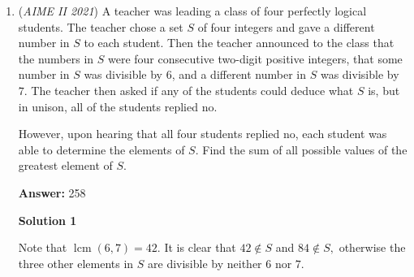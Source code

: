 \begin{enumerate}
 


	\item (\textit{AIME II 2021}) A teacher was leading a class of four perfectly logical students. The teacher chose a set $S$ of four integers and gave a different number in $S$ to each student. Then the teacher announced to the class that the numbers in $S$ were four consecutive two-digit positive integers, that some number in $S$ was divisible by $6$, and a different number in $S$ was divisible by $7$. The teacher then asked if any of the students could deduce what $S$ is, but in unison, all of the students replied no.


 However, upon hearing that all four students replied no, each student was able to determine the elements of $S$. Find the sum of all possible values of the greatest element of $S$.


 
 \textbf{Answer: }258



\textbf{Solution 1}

Note that $\operatorname{lcm}(6,7)=42.$ It is clear that $42\not\in S$ and $84\not\in S,$ otherwise the three other elements in $S$ are divisible by neither $6$ nor $7.$


\end{enumerate}
